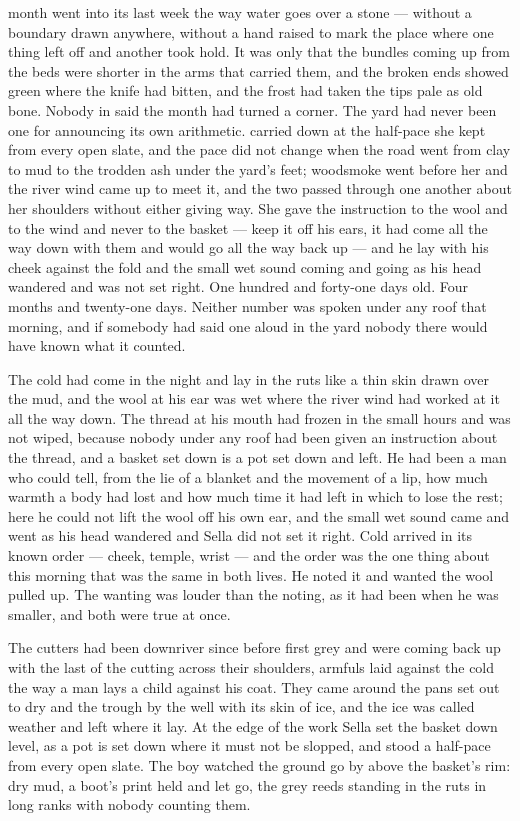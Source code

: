 
 month went into its last week the way water goes over a stone --- without a boundary drawn anywhere, without a hand raised to mark the place where one thing left off and another took hold. It was only that the bundles coming up from the beds were shorter in the arms that carried them, and the broken ends showed green where the knife had bitten, and the frost had taken the tips pale as old bone. Nobody in  said the month had turned a corner. The yard had never been one for announcing its own arithmetic.  carried  down at the half-pace she kept from every open slate, and the pace did not change when the road went from clay to mud to the trodden ash under the yard's feet; woodsmoke went before her and the river wind came up to meet it, and the two passed through one another about her shoulders without either giving way. She gave the instruction to the wool and to the wind and never to the basket --- keep it off his ears, it had come all the way down with them and would go all the way back up --- and he lay with his cheek against the fold and the small wet sound coming and going as his head wandered and was not set right. One hundred and forty-one days old. Four months and twenty-one days. Neither number was spoken under any roof that morning, and if somebody had said one aloud in the yard nobody there would have known what it counted.

The cold had come in the night and lay in the ruts like a thin skin drawn over the mud, and the wool at his ear was wet where the river wind had worked at it all the way down. The thread at his mouth had frozen in the small hours and was not wiped, because nobody under any roof had been given an instruction about the thread, and a basket set down is a pot set down and left. He had been a man who could tell, from the lie of a blanket and the movement of a lip, how much warmth a body had lost and how much time it had left in which to lose the rest; here he could not lift the wool off his own ear, and the small wet sound came and went as his head wandered and Sella did not set it right. Cold arrived in its known order --- cheek, temple, wrist --- and the order was the one thing about this morning that was the same in both lives. He noted it and wanted the wool pulled up. The wanting was louder than the noting, as it had been when he was smaller, and both were true at once.

The cutters had been downriver since before first grey and were coming back up with the last of the cutting across their shoulders, armfuls laid against the cold the way a man lays a child against his coat. They came around the pans set out to dry and the trough by the well with its skin of ice, and the ice was called weather and left where it lay. At the edge of the work Sella set the basket down level, as a pot is set down where it must not be slopped, and stood a half-pace from every open slate. The boy watched the ground go by above the basket's rim: dry mud, a boot's print held and let go, the grey reeds standing in the ruts in long ranks with nobody counting them.

